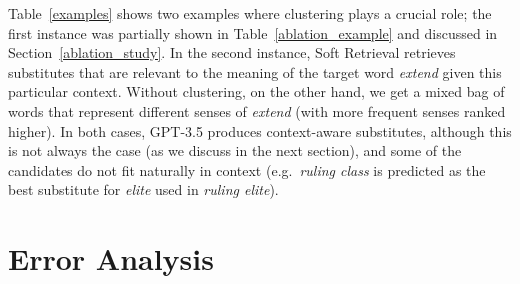 \documentclass[11pt]{article}
\newcommand{\secref}[2][]{Section#1~\ref{#2}\xspace}
\newcommand{\tabref}[2][]{Table#1~\ref{#2}\xspace}
\newcommand{\ex}[1]{\textit{#1}\xspace}
\begin{document}
\tabref[]{examples} shows two examples where clustering plays a crucial role; the first instance was partially shown in \tabref{ablation_example} and discussed in \secref{ablation_study}. In the second instance, Soft Retrieval retrieves substitutes that are relevant to the meaning of the target word \ex{extend} given this particular context. Without clustering, on the other hand, we get a mixed bag of words that represent different senses of \ex{extend} (with more frequent senses ranked higher). In both cases, GPT-3.5 produces context-aware substitutes, although this is not always the case (as we discuss in the next section), and some of the candidates do not fit naturally in context (e.g.\ \ex{ruling class} is predicted as the best substitute for \ex{elite} used in \ex{{ruling} {elite}}).

\section{Error Analysis}
\end{document}
